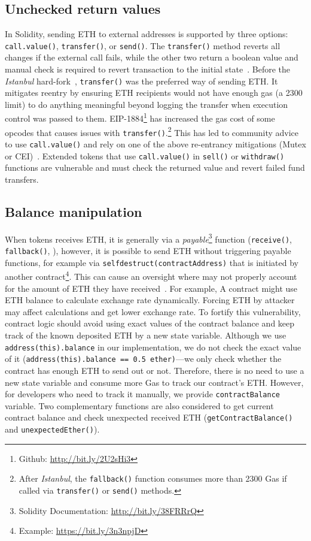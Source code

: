 \subsection{Unchecked return values}
In Solidity, sending ETH to external addresses is supported by three options: \texttt{call.value()}, \texttt{transfer()}, or \texttt{send()}. The \texttt{transfer()} method reverts all changes if the external call fails, while the other two return a boolean value and manual check is required to revert transaction to the initial state~\cite{SoliditySendEther}. Before the \textit{Istanbul} hard-fork~\cite{IstanbulUpgrades}, \texttt{transfer()} was the preferred way of sending ETH. It mitigates reentry by ensuring ETH recipients would not have enough gas (\ie a 2300 limit) to do anything meaningful beyond logging the transfer when execution control was passed to them. EIP-1884\footnote{Github: \url{http://bit.ly/2U2sHi3}} has increased the gas cost of some opcodes that causes issues with \texttt{transfer()}.\footnote{After \textit{Istanbul}, the \texttt{fallback()} function consumes more than 2300 Gas if called via \texttt{transfer()} or \texttt{send()} methods.} This has led to community advice to use \texttt{call.value()} and rely on one of the above re-entrancy mitigations (\ie Mutex or CEI)~\cite{ConsensysStopTran,ChainSecurity}. { \blue Extended \erc tokens that use \texttt{call.value()} in \texttt{sell()} or \texttt{withdraw()} functions are vulnerable and must check the returned value and revert failed fund transfers}.

\subsection{Balance manipulation}
\label{sec:unexpected}

When \erc tokens receives ETH, it is generally via a \textit{payable}\footnote{Solidity Documentation: \url{http://bit.ly/38FRRrQ}} function (\ie \texttt{receive()}, \texttt{fallback()}, \etc), however, it is possible to send ETH without triggering payable functions, for example via \texttt{selfdestruct(contractAddress)} that is initiated by another contract\footnote{Example: \url{https://bit.ly/3n3npjD}}. This can cause an oversight where \erc may not properly account for the amount of ETH they have received~\cite{UnexpectedEth}. { \blue For example, A contract might use ETH balance to calculate exchange rate dynamically. Forcing ETH by attacker may affect calculations and get lower exchange rate.} To fortify this vulnerability, contract logic should avoid using exact values of the contract balance and keep track of the known deposited ETH by a new state variable. Although we use \texttt{address(this).balance} in our implementation, we do not check the exact value of it (\ie \texttt{address(this).balance == 0.5 ether)}---we only check whether the contract has enough ETH to send out or not. Therefore, there is no need to use a new state variable and consume more Gas to track our contract's ETH. However, for developers who need to track it manually, we provide \texttt{contractBalance} variable. Two complementary functions are also considered to get current contract balance and check unexpected received ETH (\ie \texttt{getContractBalance()} and \texttt{unexpectedEther()}).

